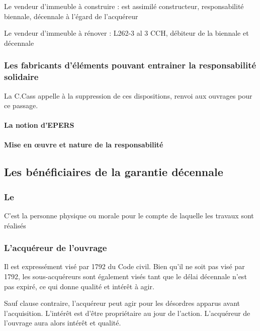 			Le vendeur d’immeuble à construire : est assimilé constructeur, responsabilité biennale, décennale à l’égard de l’acquéreur

			Le vendeur d’immeuble à rénover : L262-3 al 3 CCH, débiteur de la biennale et décennale


		\subsubsection{Les fabricants d'éléments pouvant entrainer la responsabilité solidaire}

		La C.Cass appelle à la suppression de ces dispositions, renvoi aux ouvrages pour ce passage.

			\paragraph{La notion d'EPERS}

				\aCompleter

			\paragraph{Mise en œuvre et nature de la responsabilité}

				\aCompleter

	\subsection{Les bénéficiaires de la garantie décennale}

		\subsubsection{Le \Mo}

			C’est la personne physique ou morale pour le compte de laquelle les travaux sont réalisés

		\subsubsection{L'acquéreur de l'ouvrage}

		Il est expressément visé par 1792 du Code civil. Bien qu’il ne soit pas visé par 1792, les sous-acquéreurs sont également visés tant que le délai décennale n’est pas expiré, ce qui donne qualité et intérêt à agir.

		Sauf clause contraire, l’acquéreur peut agir pour les désordres apparus avant l’acquisition. L’intérêt est d’être propriétaire au jour de l’action. L’acquéreur de l’ouvrage aura alors intérêt et qualité.

